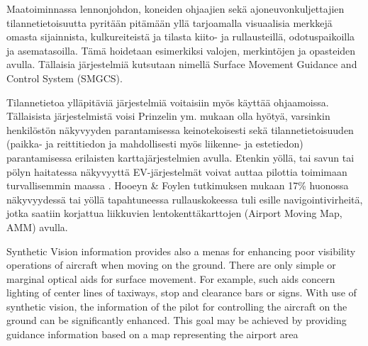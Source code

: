 \documentclass[utf8,bachelor,manualbib]{gradu3}
\begin{document}
Maatoiminnassa lennonjohdon, koneiden ohjaajien sekä ajoneuvonkuljettajien tilannetietoisuutta pyritään pitämään yllä tarjoamalla visuaalisia merkkejä omasta sijainnista, kulkureiteistä ja tilasta kiito- ja rullausteillä, odotuspaikoilla ja asematasoilla. Tämä hoidetaan esimerkiksi valojen, merkintöjen ja opasteiden avulla. Tällaisia järjestelmiä kutsutaan nimellä Surface Movement Guidance and Control System (SMGCS). \citep{prinzel2013}

Tilannetietoa ylläpitäviä järjestelmiä voitaisiin myös käyttää ohjaamoissa. Tällaisista järjestelmistä voisi Prinzelin ym. \citeyearpar{prinzel2013} mukaan olla hyötyä, varsinkin henkilöstön näkyvyyden parantamisessa keinotekoisesti sekä tilannetietoisuuden (paikka- ja reittitiedon ja mahdollisesti myös liikenne- ja estetiedon) parantamisessa erilaisten karttajärjestelmien avulla. Etenkin yöllä, tai savun tai pölyn haitatessa näkyvyyttä EV-järjestelmät voivat auttaa pilottia toimimaan turvallisemmin maassa \citep{prinzel2013}. Hooeyn \& Foylen \citeyearpar{hooey2007} tutkimuksen mukaan 17\% huonossa näkyvyydessä tai yöllä tapahtuneessa rullauskokeessa tuli esille navigointivirheitä, jotka saatiin korjattua liikkuvien lentokenttäkarttojen (Airport Moving Map, AMM) avulla.

Synthetic Vision information provides also a menas for enhancing poor visibility operations of aircraft when moving on the ground. There are only simple or marginal optical aids for surface movement.
For example, such aids concern lighting of center lines of
taxiways, stop and clearance bars or signs.
With use of synthetic vision, the information of the pilot for
controlling the aircraft on the ground can be significantly
enhanced. This goal may be achieved by providing guidance
information based on a map representing the airport area \citep{mollersachs1994} 
\end{document}
